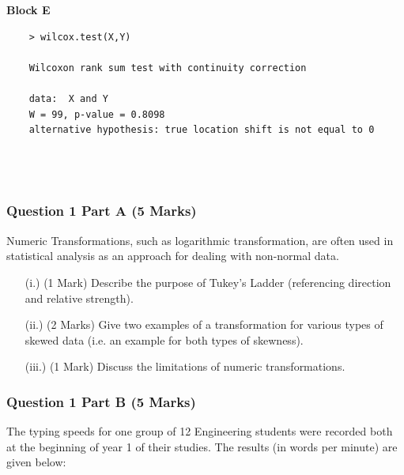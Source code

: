 \documentclass[a4paper,12pt]{article}
\begin{document}
\begin{framed}
	\textbf{Block E}
	\begin{verbatim}
	> wilcox.test(X,Y)
	
	Wilcoxon rank sum test with continuity correction
	
	data:  X and Y
	W = 99, p-value = 0.8098
	alternative hypothesis: true location shift is not equal to 0
	
	
	
	\end{verbatim}	
\end{framed}
\subsubsection*{Question 1 Part A (5 Marks)}
Numeric Transformations, such as logarithmic transformation, are often used in statistical analysis as an approach for dealing with non-normal data.
\begin{itemize}
	\item[(i.)] (1 Mark) Describe the purpose of Tukey's Ladder (referencing direction and relative strength).
	\item[(ii.)] (2 Marks) Give two examples of a transformation for various types of skewed data (i.e. an example for both types of skewness).
	\item[(iii.)] (1 Mark) Discuss the limitations of numeric transformations.
\end{itemize}
\bigskip

\subsubsection*{Question 1 Part B (5 Marks)}

The typing speeds for one group of 12 Engineering students were recorded both at the beginning of year 1 of their studies. The results (in words per minute) are given below:
\end{document}
